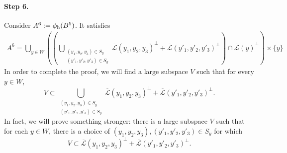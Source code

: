 \documentclass[12pt]{article}
\newcommand{\hr}{\textup{h}}
\newcommand{\LL}{\mathcal{L}}
\begin{document}

\paragraph{Step 6.} Consider $A^6:= \phi_\hr(B^5)$. It satisfies
\begin{align*}
	A^6 = \bigcup_{y\in W}\left( \left( \bigcup_{\substack{(y_1,y_2,y_3) \in S_y \\(y'_1,y'_2,y'_3) \in S_y}}\overline{\LL}(y_1,y_2,y_3)^\perp + \overline{\LL}(y'_1,y'_2,y'_3)^\perp  \right) \cap {\overline{\LL}(y)}^\perp \right) \times \{y\}
\end{align*}
In order to complete the proof, we will find a large subspace $V$ such that for every $y\in W $,
$$V \subset \bigcup_{\substack{(y_1,y_2,y_3) \in S_y \\(y'_1,y'_2,y'_3) \in S_y}}\overline{\LL}(y_1,y_2,y_3)^\perp + \overline{\LL}(y'_1,y'_2,y'_3)^\perp  .$$
In fact, we will prove something stronger: there is a large subspace $V$ such that for each $y\in W$, there is a choice of $(y_1,y_2,y_3),(y'_1,y'_2,y'_3) \in S_y$ for which
$$V\subset  \overline{\LL}(y_1,y_2,y_3)^\perp + \overline{\LL}(y'_1,y'_2,y'_3)^\perp .$$
\end{document}

